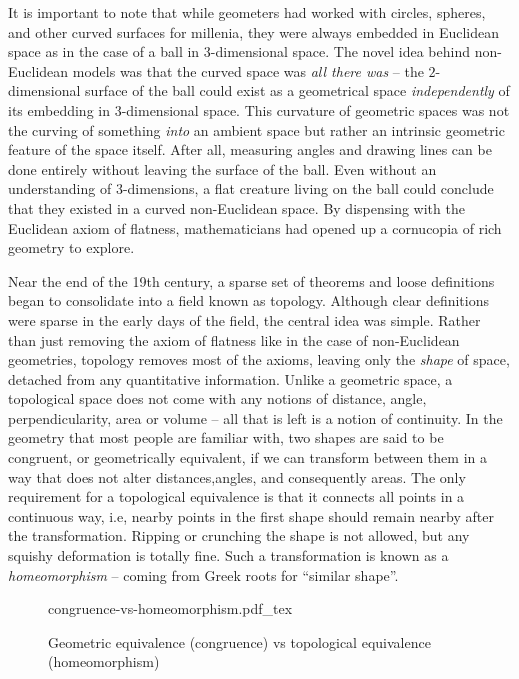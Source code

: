 It is important to note that while geometers had worked with circles, spheres, and other curved surfaces for millenia, they were always embedded in Euclidean space as in the case of a ball in $3$-dimensional space. The novel idea behind non-Euclidean models was that the curved space was \emph{all there was} -- the $2$-dimensional surface of the ball could exist as a geometrical space \emph{independently} of its embedding in $3$-dimensional space.
This curvature of geometric spaces was not the curving of something \emph{into} an ambient space but rather an intrinsic geometric feature of the space itself. After all, measuring angles and drawing lines can be done entirely without leaving the surface of the ball. Even without an understanding of $3$-dimensions, a flat creature living on the ball could conclude that they existed in a curved non-Euclidean space.
By dispensing with the Euclidean axiom of flatness, mathematicians had opened up a cornucopia of rich geometry to explore.
%

Near the end of the 19th century, a sparse set of theorems and loose definitions began to consolidate into a field known as topology. Although clear definitions were sparse in the early days of the field, the central idea was simple. Rather than just removing the axiom of flatness like in the case of non-Euclidean geometries, topology removes most of the axioms, leaving only the \emph{shape} of space, detached from any quantitative information. Unlike a geometric space, a topological space does not come with any notions of distance, angle, perpendicularity, area or volume -- all that is left is a notion of continuity.
In the geometry that most people are familiar with, two shapes are said to be congruent, or geometrically equivalent, if we can transform between them in a way that does not alter distances,angles, and consequently areas.
The only requirement for a topological equivalence is that it connects all points in a continuous way, i.e, nearby points in the first shape should remain nearby after the transformation. Ripping or crunching the shape is not allowed, but any squishy deformation is totally fine. Such a transformation is known as a \emph{homeomorphism} -- coming from Greek roots for ``similar shape''.
\begin{figure}[ht]
	\centering
	{congruence-vs-homeomorphism.pdf_tex}
	\caption{Geometric equivalence (congruence) vs topological equivalence (homeomorphism)}\label{fig:first}
\end{figure}

